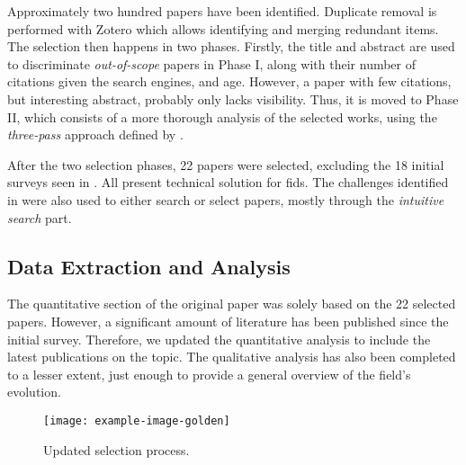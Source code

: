 Approximately two hundred papers have been identified.
Duplicate removal is performed with Zotero which allows identifying and merging redundant items.
The selection then happens in two phases.
Firstly, the title and abstract are used to discriminate \emph{out-of-scope} papers in Phase I, along with their number of citations given the search engines, and age.
However, a paper with few citations, but interesting abstract, probably only lacks visibility.
Thus, it is moved to Phase II, which consists of a more thorough analysis of the selected works, using the \emph{three-pass} approach defined by \textcite{keshav_Howreadpaper_2007}.

After the two selection phases, 22 papers were selected, excluding the 18 initial surveys seen in .
All present technical solution for \gls{fids}.
The challenges identified in  were also used to either search or select papers, mostly through the \emph{intuitive search} part.


\subsection{Data Extraction and Analysis\label{sec:sota.methodo.extraction}}

The quantitative section of the original paper was solely based on the 22 selected papers.
However, a significant amount of literature has been published since the initial survey.
Therefore, we updated the quantitative analysis to include the latest publications on the topic.
The qualitative analysis has also been completed to a lesser extent, just enough to provide a general overview of the field's evolution.


\begin{figure}
\centering
  \texttt{[image: example-image-golden]}
  \caption{Updated selection process.}
  \label{fig:methodo.update}
\end{figure}




